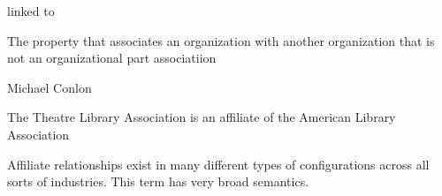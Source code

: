 \documentclass[letterpaper,10pt,english]{sphinxmanual}
\begin{document}
\begin{sphinxShadowBox}

\sphinxAtStartPar
linked to
\end{sphinxShadowBox}

\begin{sphinxShadowBox}

\sphinxAtStartPar
{}
\end{sphinxShadowBox}

\begin{sphinxShadowBox}

\sphinxAtStartPar
The property that associates an organization with another organization that is not an organizational part associatiion
\end{sphinxShadowBox}

\begin{sphinxShadowBox}

\sphinxAtStartPar
Michael Conlon 
\end{sphinxShadowBox}

\begin{sphinxShadowBox}

\sphinxAtStartPar
{\hyperref[\detokenize{doc-ORG_0000001::doc}]{}}
\end{sphinxShadowBox}

\begin{sphinxShadowBox}

\sphinxAtStartPar
{\hyperref[\detokenize{doc-ORG_0000001::doc}]{}}
\end{sphinxShadowBox}

\begin{sphinxShadowBox}

\sphinxAtStartPar
The Theatre Library Association is an affiliate of the American Library Association
\end{sphinxShadowBox}

\begin{sphinxShadowBox}

\sphinxAtStartPar
Affiliate relationships exist in many different types of configurations across all sorts of industries.  This term has very broad semantics.
\end{sphinxShadowBox}
\end{document}
